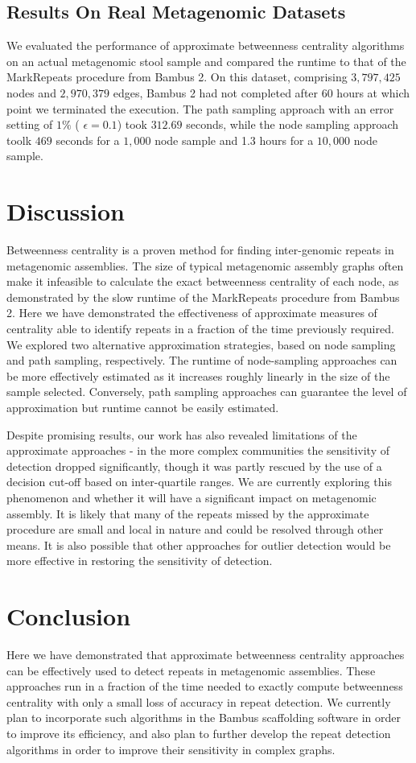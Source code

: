 \documentclass[runningheads,a4paper]{llncs}
\begin{document}
\subsection*{Results On Real Metagenomic Datasets}
We evaluated the performance of approximate betweenness centrality algorithms on an actual metagenomic stool sample and compared the runtime to that of the MarkRepeats procedure from Bambus 2.  On this dataset, comprising $3,797,425$ nodes and $2,970,379$ edges, Bambus 2 had not completed after 60 hours at which point we terminated the execution.  The path sampling approach with an error setting of $1\%$ ( $\epsilon = 0.1$) took $312.69$ seconds, while the node sampling approach toolk $469$ seconds for a $1,000$ node sample and 1.3 hours for a $10,000$  node sample.  


\section{Discussion}
Betweenness centrality is a proven method for finding inter-genomic repeats in metagenomic assemblies. The size of typical metagenomic assembly graphs often make it infeasible to calculate the exact betweenness centrality of each node, as demonstrated by the slow runtime of the MarkRepeats procedure from Bambus 2.  Here we have demonstrated the effectiveness of approximate measures of centrality able to identify repeats in a fraction of the time previously required.   We explored two alternative approximation strategies, based on node sampling and path sampling, respectively.  The runtime of node-sampling approaches can be more effectively estimated as it increases roughly linearly in the size of the sample selected.  Conversely, path sampling approaches can guarantee the level of approximation but runtime cannot be easily estimated. 

Despite promising results, our work has also revealed limitations of the approximate approaches - in the more complex communities the sensitivity of detection dropped significantly, though it was partly rescued by the use of a decision cut-off based on inter-quartile ranges.   We are currently exploring this phenomenon and whether it will have a significant impact on metagenomic assembly. It is likely that many of the repeats missed by the approximate procedure are small and local in nature and could be resolved through other means.  It is also possible that other approaches for outlier detection would be more effective in restoring the sensitivity of detection. 

\section{Conclusion}
Here we have demonstrated that approximate betweenness centrality approaches can be effectively used to detect repeats in metagenomic assemblies.  These approaches run in a fraction of the time needed to exactly compute betweenness centrality with only a small loss of accuracy in repeat detection. We currently plan to incorporate such algorithms in the Bambus scaffolding software in order to improve its efficiency, and also plan to further develop the repeat detection algorithms in order to improve their sensitivity in complex graphs. 
{}

\end{document}

